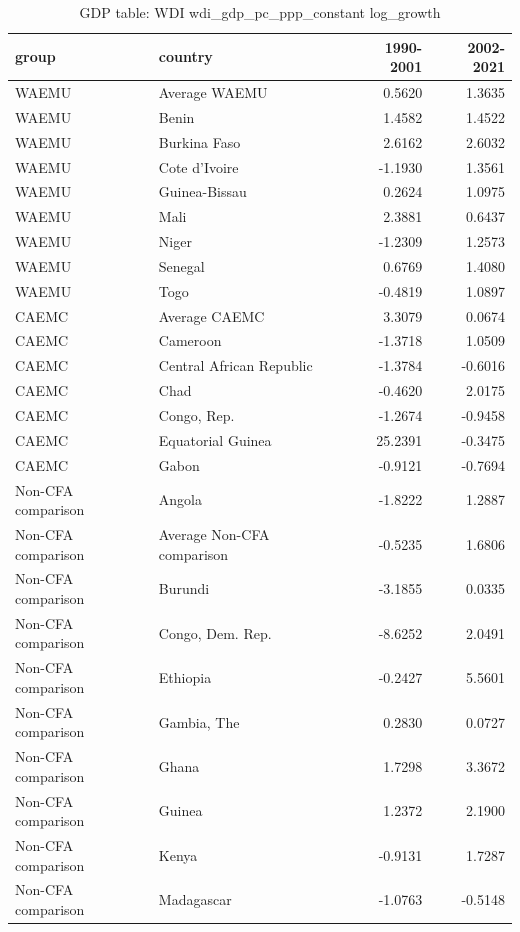 \begin{table}

\caption{GDP table: WDI wdi_gdp_pc_ppp_constant log_growth}
\centering
\begin{tabular}[t]{llrr}
\toprule
group & country & 1990-2001 & 2002-2021\\
\midrule
WAEMU & Average WAEMU & 0.5620 & 1.3635\\
WAEMU & Benin & 1.4582 & 1.4522\\
WAEMU & Burkina Faso & 2.6162 & 2.6032\\
WAEMU & Cote d'Ivoire & -1.1930 & 1.3561\\
WAEMU & Guinea-Bissau & 0.2624 & 1.0975\\
\addlinespace
WAEMU & Mali & 2.3881 & 0.6437\\
WAEMU & Niger & -1.2309 & 1.2573\\
WAEMU & Senegal & 0.6769 & 1.4080\\
WAEMU & Togo & -0.4819 & 1.0897\\
CAEMC & Average CAEMC & 3.3079 & 0.0674\\
\addlinespace
CAEMC & Cameroon & -1.3718 & 1.0509\\
CAEMC & Central African Republic & -1.3784 & -0.6016\\
CAEMC & Chad & -0.4620 & 2.0175\\
CAEMC & Congo, Rep. & -1.2674 & -0.9458\\
CAEMC & Equatorial Guinea & 25.2391 & -0.3475\\
\addlinespace
CAEMC & Gabon & -0.9121 & -0.7694\\
Non-CFA comparison & Angola & -1.8222 & 1.2887\\
Non-CFA comparison & Average Non-CFA comparison & -0.5235 & 1.6806\\
Non-CFA comparison & Burundi & -3.1855 & 0.0335\\
Non-CFA comparison & Congo, Dem. Rep. & -8.6252 & 2.0491\\
\addlinespace
Non-CFA comparison & Ethiopia & -0.2427 & 5.5601\\
Non-CFA comparison & Gambia, The & 0.2830 & 0.0727\\
Non-CFA comparison & Ghana & 1.7298 & 3.3672\\
Non-CFA comparison & Guinea & 1.2372 & 2.1900\\
Non-CFA comparison & Kenya & -0.9131 & 1.7287\\
\addlinespace
Non-CFA comparison & Madagascar & -1.0763 & -0.5148\\

\end{tabular}
\end{table}

